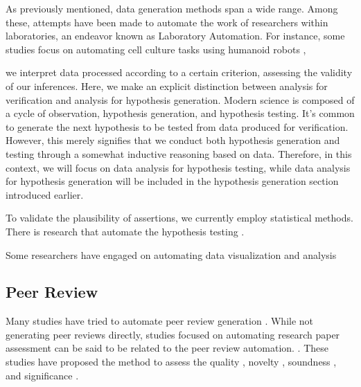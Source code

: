 \documentclass{book}
\begin{document}
As previously mentioned, data generation methods span a wide range. Among these, attempts have been made to automate the work of researchers within laboratories, an endeavor known as Laboratory Automation. For instance, 
some studies focus on automating cell culture tasks using humanoid robots \cite{ochiai2021variable},

we interpret data processed according to a certain criterion, assessing the validity of our inferences. Here, we make an explicit distinction between analysis for verification and analysis for hypothesis generation. Modern science is composed of a cycle of observation, hypothesis generation, and hypothesis testing. It's common to generate the next hypothesis to be tested from data produced for verification. However, this merely signifies that we conduct both hypothesis generation and testing through a somewhat inductive reasoning based on data. Therefore, in this context, we will focus on data analysis for hypothesis testing, while data analysis for hypothesis generation will be included in the hypothesis generation section introduced earlier.

To validate the plausibility of assertions, we currently employ statistical methods. There is research that automate the hypothesis testing \cite{gil2016automated}. 

Some researchers have engaged on automating data visualization and analysis \cite{bavishi2021vizsmith,bavishi2022tools}



\subsection{Peer Review}
Many studies have tried to automate peer review generation \cite{thelwall2019artificial,li2019generating,schulz2022future,yuan2022can,yuan2022kid,lin2021automated1,lin2021automated2,kumar2022investigations,bharti2022can,uban2021generating,wang2020reviewrobot}. While not generating peer reviews directly, studies focused on automating research paper assessment  can be said to be related to the peer review automation. \cite{kousha2022artificial,li2020multi,huang2018deep}. These studies have proposed the method to assess the quality \cite{thelwall2022predicting,thelwall2022can}, novelty \cite{pelletier2022novelpy,amplayo2019evaluating,shibayama2020measuring}, soundness \cite{cabanac2022decontamination}, and significance \cite{zong2022citation,xia2023review,soni2022predicting,manghi2021new,soni2021follow,van2020schubert,mckeown2016predicting}.
\end{document}
